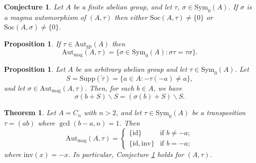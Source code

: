 \documentclass[10pt,a4paper]{amsart}
\numberwithin{equation}{section}
\newtheorem{theorem}[lemma]{Theorem}
\newtheorem{proposition}[lemma]{Proposition}
\newtheorem{conjecture}[lemma]{Conjecture}
\theoremstyle{definition}
\newcommand{\id}{\mathrm{id}}
\newcommand{\inv}{\mathrm{inv}}
\newcommand{\Soc}{\mathrm{Soc}}
\newcommand{\Autgp}{\mathrm{Aut}_{\mathrm{gp}}}
\newcommand{\Autmag}{\mathrm{Aut}_\mathrm{mag}}
\newcommand{\Symo}{\mathrm{Sym}_0}
\newcommand{\ttau}{\tilde{\tau}}
\newcommand{\Supp}{\mathrm{Supp}}
\begin{document}
\setcounter{section}{1}
\setcounter{equation}{8}
\setcounter{lemma}{1}
\begin{conjecture}  \label{main-conj}
Let $A$ be a finite abelian group, and let $\tau$, $\sigma \in \Symo(A)$. If $\sigma$ is a magma automorphism of $(A,\tau)$ then either $\Soc(A,\tau)\neq \{0\}$ or $\Soc(A,\sigma)\neq \{0\}$.
\end{conjecture}

\setcounter{section}{2}
\setcounter{equation}{2}
\setcounter{lemma}{5}
\begin{proposition} \label{autom}
If $\tau \in \Autgp(A)$ then 
$$ \Autmag(A,\tau) = \{ \sigma \in \Symo(A) : \sigma \tau = \tau \sigma \}. $$
\end{proposition}

\setcounter{section}{3}
\setcounter{equation}{0}
\setcounter{lemma}{0}
\begin{proposition} \label{S-lem}
Let $A$ be an arbitrary abelian group and let $\tau \in \Symo(A)$. Let
$$ S= \Supp(\ttau) = \{ a \in A : -\tau(-a) \neq a \},  $$
and let $\sigma \in \Autmag(A,\tau)$. Then, for each $b \in A$, we have  
	$$ \sigma(b+S) \backslash S =(\sigma(b)+S) \backslash S. $$
\end{proposition}

\setcounter{section}{3}
\setcounter{equation}{0}
\setcounter{lemma}{1}
\begin{theorem} \label{trans-thm}
Let $A=C_n$ with $n>2$, and let $\tau \in \Symo(A)$ be a transposition $\tau=(ab)$ where $\gcd(b-a,n)=1$. Then	
\begin{equation} \label{transp-aut}
		\Autmag(A,\tau) = \begin{cases} \{\id\} & \mbox{if } b \neq -a; \\
		\{\id, \inv\} & \mbox{if } b =-a;
	\end{cases} 
\end{equation}
where $\inv(x)=-x$. In particular, Conjecture \ref{main-conj} holds for $(A, \tau)$. 
\end{theorem}
\end{document}
